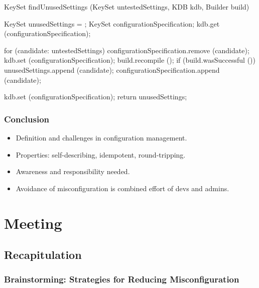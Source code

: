 \begin{frame}[fragile]
	\small
	\fontsize{10}{0}\selectfont
	\begin{code}[gobble=4,language=Cpp]
	KeySet findUnusedSettings (KeySet untestedSettings,
				   KDB kdb,
				   Builder build)
	{
	   KeySet unusedSettings = {};
	   KeySet configurationSpecification;
	   kdb.get (configurationSpecification);

	   for (candidate: untestedSettings)
	   {
	       configurationSpecification.remove (candidate);
	       kdb.set (configurationSpecification);
	       build.recompile ();
	       if (build.wasSuccessful ())
	       {
	          unusedSettings.append (candidate);
	       }
	       configurationSpecification.append (candidate);
	   }

	   kdb.set (configurationSpecification);
	   return unusedSettings;
	}
	\end{code}
\end{frame}

\begin{frame}
	\frametitle{Conclusion}

	\begin{itemize}[<+-| alert@+>]
	\item Definition and challenges in configuration management.
	\item Properties: self-describing, idempotent, round-tripping.
	\item Awareness and responsibility needed.
	\item Avoidance of misconfiguration is combined effort of devs and admins.
	\end{itemize}
\end{frame}


\section{Meeting}

\subsection{Recapitulation}



\begin{assignment}
	\frametitle{Brainstorming: Strategies for Reducing Misconfiguration}
\end{assignment}

